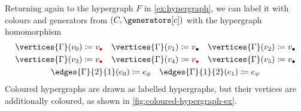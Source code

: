 \begin{example}\label{ex:coloured-hypergraph}
    Returning again to the hypergraph \(F\) in \cref{ex:hypergraph}, we can
    label it with colours and generators from \((C,\generators[c])\) with
    the hypergraph homomorphism
    \begin{gather*}
        \vertices{\Gamma}(v_0) \coloneqq v_{\redbullet}
        \quad
        \vertices{\Gamma}(v_1) \coloneqq v_{\bullet}
        \quad
        \vertices{\Gamma}(v_2) \coloneqq v_{\bullet}
        \\
        \vertices{\Gamma}(v_3) \coloneqq v_{\redbullet}
        \quad
        \vertices{\Gamma}(v_4) \coloneqq v_{\redbullet}
        \quad
        \vertices{\Gamma}(v_5) \coloneqq v_{\bullet}
        \\
        \edges{\Gamma}{2}{1}(e_0) \coloneqq e_{\phi}
        \quad
        \edges{\Gamma}{1}{2}(e_1) \coloneqq e_{\psi}
    \end{gather*}
    Coloured hypergraphs are drawn as labelled hypergraphs, but their vertices
    are additionally coloured, as shown in \cref{fig:coloured-hypergraph-ex}.
\end{example}